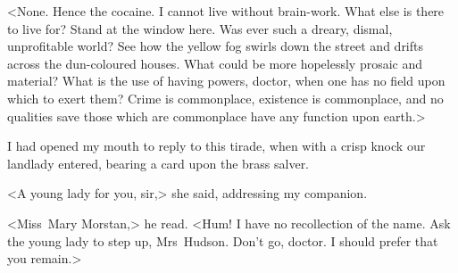 <None. Hence the cocaine. I cannot live without brain-work. What else is there to live for? Stand at the window here. Was ever such a dreary, dismal, unprofitable world? See how the yellow fog swirls down the street and drifts across the dun-coloured houses. What could be more hopelessly prosaic and material? What is the use of having powers, doctor, when one has no field upon which to exert them? Crime is commonplace, existence is commonplace, and no qualities save those which are commonplace have any function upon earth.>

I had opened my mouth to reply to this tirade, when with a crisp knock our landlady entered, bearing a card upon the brass salver.

<A young lady for you, sir,> she said, addressing my companion.

<Miss~Mary Morstan,> he read. <Hum! I have no recollection of the name. Ask the young lady to step up, Mrs~Hudson. Don't go, doctor. I should prefer that you remain.>